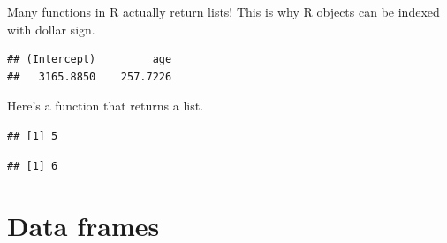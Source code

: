 \documentclass[openany]{book}
\newenvironment{Shaded}{\begin{snugshade}}{\end{snugshade}}
\newcommand{\ControlFlowTok}[1]{\textcolor[rgb]{0.13,0.29,0.53}{\textbf{#1}}}
\newcommand{\DataTypeTok}[1]{\textcolor[rgb]{0.13,0.29,0.53}{#1}}
\newcommand{\DecValTok}[1]{\textcolor[rgb]{0.00,0.00,0.81}{#1}}
\newcommand{\KeywordTok}[1]{\textcolor[rgb]{0.13,0.29,0.53}{\textbf{#1}}}
\newcommand{\NormalTok}[1]{#1}
\newcommand{\OperatorTok}[1]{\textcolor[rgb]{0.81,0.36,0.00}{\textbf{#1}}}
\newcommand{\StringTok}[1]{\textcolor[rgb]{0.31,0.60,0.02}{#1}}
\begin{document}
Many functions in R actually return lists! This is why R objects can be indexed with dollar sign.

\begin{Shaded}
\end{Shaded}

\begin{verbatim}
## (Intercept)         age 
##   3165.8850    257.7226
\end{verbatim}

Here's a function that returns a list.

\begin{Shaded}
\end{Shaded}

\begin{verbatim}
## [1] 5
\end{verbatim}

\begin{Shaded}
\end{Shaded}

\begin{verbatim}
## [1] 6
\end{verbatim}

\hypertarget{data-frames}{%
\section{Data frames}\label{data-frames}}
\end{document}
